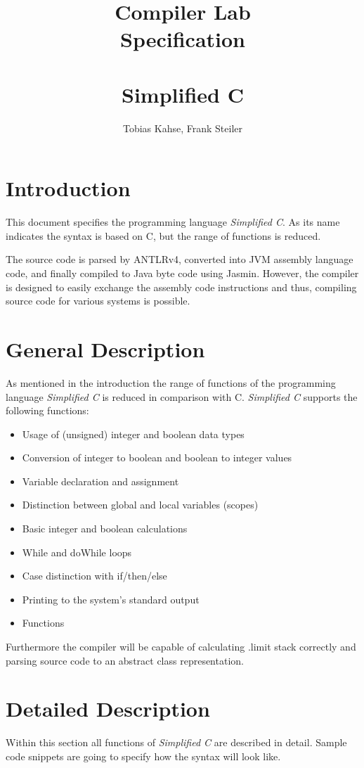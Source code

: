 \documentclass[12pt,a4paper,titlepage,oneside,final]{article}
\author{Tobias Kahse, Frank Steiler}
\title{Compiler Lab\\Specification\\~\\Simplified C}
\begin{document}
\maketitle

\tableofcontents
\pagebreak

\section{Introduction}
This document specifies the programming language \emph{Simplified C}. As its name indicates the syntax is based on C, but the range of functions is reduced.

The source code is parsed by ANTLRv4, converted into JVM assembly language code, and finally compiled to Java byte code using Jasmin. However, the compiler is designed to easily exchange the assembly code instructions and thus, compiling source code for various systems is possible.

\section{General Description}
As mentioned in the introduction the range of functions of the programming language \emph{Simplified C} is reduced in comparison with C. \emph{Simplified C} supports the following functions:

\begin{itemize}
\item Usage of (unsigned) integer and boolean data types
\item Conversion of integer to boolean and boolean to integer values
\item Variable declaration and assignment
\item Distinction between global and local variables (scopes)
\item Basic integer and boolean calculations
\item While and doWhile loops
\item Case distinction with if/then/else
\item Printing to the system's standard output
\item Functions
\end{itemize}
Furthermore the compiler will be capable of calculating .limit stack correctly and parsing source code to an abstract class representation.

\section{Detailed Description}
Within this section all functions of \emph{Simplified C} are described in detail. Sample code snippets are going to specify how the syntax will look like.
\end{document}
